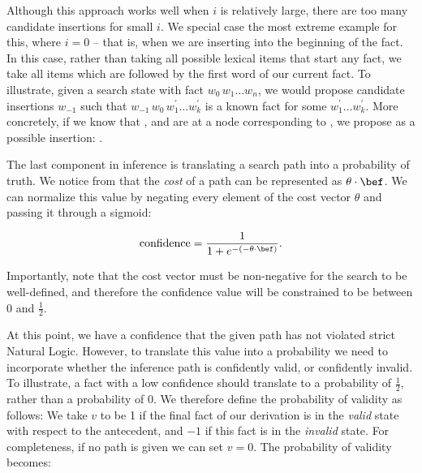 Although this approach works well when $i$ is relatively large, there
  are too many candidate insertions for small $i$.
We special case the most extreme example for this, where $i=0$ -- that is, 
  when we are inserting into the beginning of the fact.
In this case, rather than taking all possible lexical items that start
  any fact, we take all items which are followed by the first word of
  our current fact.
To illustrate, given a search state with fact $w_0\,w_1 \dots w_n$,
  we would propose candidate insertions $w_{-1}$ such that
  $w_{-1}\,w_0\,w^\prime_1 \dots w^\prime_k$ is a known fact
  for some $w^\prime_1 \dots w^\prime_k$.
More concretely, if we know that , and are
  at a node corresponding to , we propose 
  as a possible insertion: .

%
%
The last component in inference is translating a search path into a
  probability of truth.
We notice from  that the \textit{cost}
  of a path can be represented as $\theta \cdot \bef$.
We can normalize this value by negating every element of the cost
  vector $\theta$ and passing it through a sigmoid:

\vspace{-0.5em}
\begin{equation*}
\textrm{confidence} = \frac{1}{1 + e^{- (-\theta \cdot \bef)}}.
\end{equation*}
\vspace{-0.5em}

Importantly, note that the cost vector must be non-negative for the
  search to be well-defined, and therefore the confidence value will
  be constrained to be between 0 and $\frac{1}{2}$.

At this point, we have a confidence that the given path has not violated
  strict Natural Logic.
However, to translate this value into a probability
  we need to incorporate whether the inference path is
  confidently valid, or confidently invalid.
To illustrate, a fact with a low confidence should translate to a
  probability of $\frac{1}{2}$, rather than a probability of 0.
We therefore define the probability of validity as follows:
We take $v$ to be 1 if the final fact of our derivation is in the
  \textit{valid} state with respect to the antecedent,
  and $-1$ if this fact is in the \textit{invalid} state.
For completeness, if no path is given we can set $v=0$.
The probability of validity becomes:

